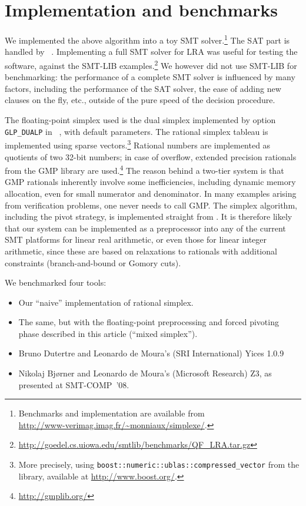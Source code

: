 \section{Implementation and benchmarks}
We implemented the above algorithm into a toy SMT solver.\footnote{Benchmarks and implementation are available from\\
\url{http://www-verimag.imag.fr/~monniaux/simplexe/}.}
The SAT part is handled by ~\cite{Minisat_SAT03}. Implementing a full SMT solver for LRA was useful for testing the software, against the SMT-LIB examples.\footnote{\url{http://goedel.cs.uiowa.edu/smtlib/benchmarks/QF_LRA.tar.gz}}
We however did not use SMT-LIB for benchmarking: the performance of a complete SMT solver is influenced by many factors, including the performance of the SAT solver, the ease of adding new clauses on the fly, etc., outside of the pure speed of the decision procedure.

The floating-point simplex used is the dual simplex implemented by option \verb+GLP_DUALP+ in ~\cite{GLPK}, with default parameters.
The rational simplex tableau is implemented using sparse vectors.\footnote{More precisely, using \texttt{boost::numeric::ublas::compressed\_vector} from the  library, available at \url{http://www.boost.org/}.}
Rational numbers are implemented as quotients of two 32-bit numbers; in case of overflow, extended precision rationals from the GMP library \cite{GMP} are used.\footnote{\url{http://gmplib.org/}} The reason behind a two-tier system is that GMP rationals inherently involve some inefficiencies, including dynamic memory allocation, even for small numerator and denominator. In many examples arising from verification problems, one never needs to call GMP. The simplex algorithm, including the pivot strategy, is implemented straight from \cite{SRI-CSL-06-01,DBLP:conf/cav/DutertreM06}. It is therefore likely that our system can be implemented as a preprocessor into any of the current SMT platforms for linear real arithmetic, or even those for linear integer arithmetic, since these are based on relaxations to rationals with additional constraints (branch-and-bound or Gomory cuts).

We benchmarked four tools:
\begin{itemize}
\item Our ``naive'' implementation of rational simplex.
\item The same, but with the floating-point preprocessing and forced pivoting phase described in this article (``mixed simplex'').
\item Bruno Dutertre and Leonardo de Moura's (SRI International) Yices 1.0.9
\item Nikolaj Bj{\o}rner and Leonardo de Moura's (Microsoft Research) Z3,
  as presented at SMT-COMP~'08.
\end{itemize}

